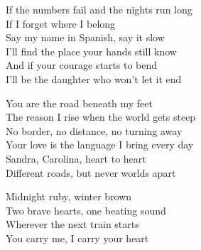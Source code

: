 \begin{lyrics}
If the numbers fail and the nights run long\\
If I forget where I belong\\
Say my name in Spanish, say it slow\\
I’ll find the place your hands still know\\
And if your courage starts to bend\\
I’ll be the daughter who won’t let it end

You are the road beneath my feet\\
The reason I rise when the world gets steep\\
No border, no distance, no turning away\\
Your love is the language I bring every day\\
Sandra, Carolina, heart to heart\\
Different roads, but never worlds apart

Midnight ruby, winter brown\\
Two brave hearts, one beating sound\\
Wherever the next train starts\\
You carry me, I carry your heart
\end{lyrics}

